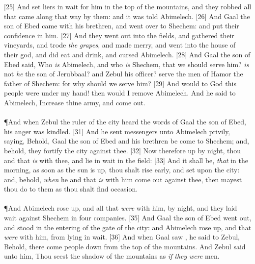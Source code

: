 [25] \textcolor[cmyk]{0.99998,1,0,0}{And  set liers in wait for him in the top of the mountains, and they robbed all that came along that way by them: and it was told Abimelech.}
[26] \textcolor[cmyk]{0.99998,1,0,0}{And Gaal the son of Ebed came with his brethren, and went over to Shechem: and  put their confidence in him.}
[27] \textcolor[cmyk]{0.99998,1,0,0}{And they went out into the fields, and gathered their vineyards, and trode \emph{the} \emph{grapes}, and made merry, and went into the house of their god, and did eat and drink, and cursed Abimelech.}
[28] \textcolor[cmyk]{0.99998,1,0,0}{And Gaal the son of Ebed said, Who \emph{is} Abimelech, and who \emph{is} Shechem, that we should serve him? \emph{is} not \emph{he} the son of Jerubbaal? and Zebul his officer? serve the men of Hamor the father of Shechem: for why should we serve him?}
[29] \textcolor[cmyk]{0.99998,1,0,0}{And would to God this people were under my hand! then would I remove Abimelech. And he said to Abimelech, Increase thine army, and come out.}\\
\\
\P \textcolor[cmyk]{0.99998,1,0,0}{And when Zebul the ruler of the city heard the words of Gaal the son of Ebed, his anger was kindled.}
[31] \textcolor[cmyk]{0.99998,1,0,0}{And he sent messengers unto Abimelech privily, saying, Behold, Gaal the son of Ebed and his brethren be come to Shechem; and, behold, they fortify the city against thee.}
[32] \textcolor[cmyk]{0.99998,1,0,0}{Now therefore up by night, thou and  that \emph{is} with thee, and lie in wait in the field:}
[33] \textcolor[cmyk]{0.99998,1,0,0}{And it shall be, \emph{that} in the morning, as soon as the sun is up, thou shalt rise early, and set upon the city: and, behold, \emph{when} he and  that \emph{is} with him come out against thee, then mayest thou do to them as thou shalt find occasion.}\\
\\
\P \textcolor[cmyk]{0.99998,1,0,0}{And Abimelech rose up, and all  that \emph{were} with him, by night, and they laid wait against Shechem in four companies.}
[35] \textcolor[cmyk]{0.99998,1,0,0}{And Gaal the son of Ebed went out, and stood in the entering of the gate of the city: and Abimelech rose up, and  that \emph{were} with him, from lying in wait.}
[36] \textcolor[cmyk]{0.99998,1,0,0}{And when Gaal saw , he said to Zebul, Behold, there come people down from the top of the mountains. And Zebul said unto him, Thou seest the shadow of the mountains as \emph{if} \emph{they} \emph{were} men.}
